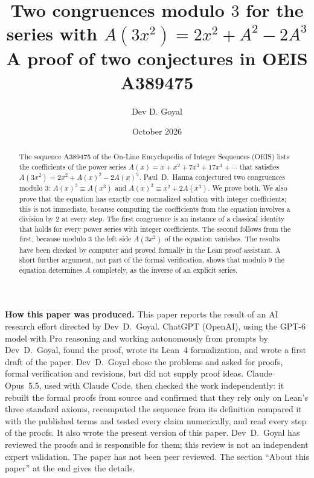 \documentclass[11pt,a4paper]{article}
\title{Two congruences modulo $3$ for the series with $A(3x^2)=2x^2+A^2-2A^3$\\[6pt]\large A proof of two conjectures in OEIS A389475}
\author{Dev D. Goyal}
\date{October 2026}
\theoremstyle{definition}
\theoremstyle{remark}
\begin{document}
\maketitle
\begin{abstract}
The sequence A389475 of the On-Line Encyclopedia of Integer Sequences (OEIS) lists the coefficients of the power series
$A(x)=x+x^2+7x^3+17x^4+\cdots$ that satisfies $A(3x^2)=2x^2+A(x)^2-2A(x)^3$. Paul~D.~Hanna conjectured two congruences
modulo $3$: $A(x)^3\equiv A(x^3)$ and $A(x)^2\equiv x^2+2A(x^3)$. We prove both. We also prove that the equation has
exactly one normalized solution with integer coefficients; this is not immediate, because computing the coefficients from the
equation involves a division by $2$ at every step. The first congruence is an instance of a classical identity that
holds for every power series with integer coefficients. The second follows from the first, because modulo $3$ the left
side $A(3x^2)$ of the equation vanishes. The results have been checked by computer and proved formally in the Lean proof
assistant. A short further argument, not part of the formal verification, shows that modulo $9$ the equation
determines $A$ completely, as the inverse of an explicit series.
\end{abstract}
\begin{center}\begin{minipage}{0.88\linewidth}\small
\textbf{How this paper was produced.} This paper reports the result of an AI research effort directed by
Dev~D.~Goyal. ChatGPT (OpenAI), using the GPT-6 model with Pro reasoning and working autonomously from prompts by
Dev~D.~Goyal, found the proof, wrote its Lean~4 formalization, and wrote a first draft of the paper.
Dev~D.~Goyal chose the problems and asked for proofs, formal verification and revisions, but did not supply proof
ideas. Claude Opus~5.5, used with Claude Code, then checked the work independently: it rebuilt the formal proofs from
source and confirmed that they rely only on Lean's three standard axioms, recomputed the sequence from its definition
compared it with the published terms and tested every claim numerically, and read every step of the proofs. It also wrote the present
version of this paper.
Dev~D.~Goyal has reviewed the proofs and is responsible for them; this review is not an independent expert validation.
The paper has not been peer reviewed.
The section ``About this paper'' at the end gives the details.
\end{minipage}\end{center}
\end{document}
